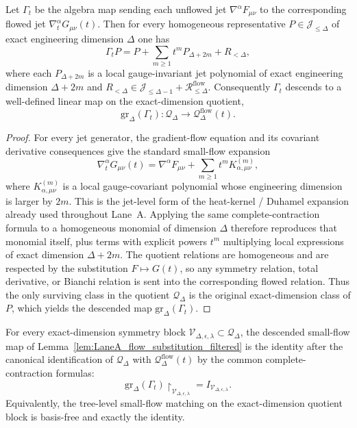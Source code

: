 \begin{lemma}\label{lem:LaneA_flow_substitution_filtered}
Let $\Gamma_t$ be the algebra map sending each unflowed jet $\nabla^{\alpha}F_{\mu\nu}$ to the corresponding flowed jet
$\nabla_t^{\alpha}G_{\mu\nu}(t)$.
Then for every homogeneous representative $P\in \mathscr J_{\le \Delta}$ of exact engineering dimension $\Delta$ one has
\begin{equation}\label{eq:LaneA_filtered_substitution_expansion}
\Gamma_t P
=
P+\sum_{m\ge 1} t^m P_{\Delta+2m}+R_{<\Delta},
\end{equation}
where each $P_{\Delta+2m}$ is a local gauge-invariant jet polynomial of exact engineering dimension $\Delta+2m$ and
$R_{<\Delta}\in \mathscr J_{\le \Delta-1}+\mathscr R^{\mathrm{flow}}_{\le \Delta}$.
Consequently $\Gamma_t$ descends to a well-defined linear map on the exact-dimension quotient,
\[
\mathrm{gr}_{\Delta}(\Gamma_t):\mathscr Q_{\Delta}\longrightarrow \mathscr Q^{\mathrm{flow}}_{\Delta}(t).
\]
\end{lemma}

\begin{proof}
For every jet generator, the gradient-flow equation and its covariant derivative consequences give the standard small-flow expansion
\[
\nabla_t^{\alpha}G_{\mu\nu}(t)
=
\nabla^{\alpha}F_{\mu\nu}+\sum_{m\ge 1} t^m K^{(m)}_{\alpha,\mu\nu},
\]
where $K^{(m)}_{\alpha,\mu\nu}$ is a local gauge-covariant polynomial whose engineering dimension is larger by $2m$.
This is the jet-level form of the heat-kernel / Duhamel expansion already used throughout Lane~A.
Applying the same complete-contraction formula to a homogeneous monomial of dimension $\Delta$ therefore reproduces that monomial itself,
plus terms with explicit powers $t^m$ multiplying local expressions of exact dimension $\Delta+2m$.
The quotient relations are homogeneous and are respected by the substitution $F\mapsto G(t)$,
so any symmetry relation, total derivative, or Bianchi relation is sent into the corresponding flowed relation.
Thus the only surviving class in the quotient $\mathscr Q_{\Delta}$ is the original exact-dimension class of $P$,
which yields the descended map $\mathrm{gr}_{\Delta}(\Gamma_t)$.
\end{proof}

\begin{theorem}\label{thm:LaneA_associated_graded_identity}
For every exact-dimension symmetry block $\mathscr V_{\Delta,\epsilon,\lambda}\subset \mathscr Q_{\Delta}$,
the descended small-flow map of Lemma~\ref{lem:LaneA_flow_substitution_filtered} is the identity after the canonical identification of
$\mathscr Q_{\Delta}$ with $\mathscr Q^{\mathrm{flow}}_{\Delta}(t)$ by the common complete-contraction formulas:
\[
\mathrm{gr}_{\Delta}(\Gamma_t)\!\restriction_{\mathscr V_{\Delta,\epsilon,\lambda}}
=
I_{\mathscr V_{\Delta,\epsilon,\lambda}}.
\]
Equivalently, the tree-level small-flow matching on the exact-dimension quotient block is basis-free and exactly the identity.
\end{theorem}

